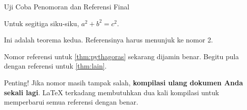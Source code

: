 \documentclass{beamer}
\begin{document}
\begin{frame}{Uji Coba Penomoran dan Referensi Final}

  \begin{Teorema}
    Untuk segitiga siku-siku, $a^2 + b^2 = c^2$.
  \end{Teorema}

  \pause %

  \begin{Teorema}
    Ini adalah teorema kedua. Referensinya harus menunjuk ke nomor 2.
  \end{Teorema}

  \vfill

  Nomor referensi untuk \cref{thm:pythagoras} sekarang dijamin benar.
  Begitu pula dengan referensi untuk \cref{thm:lain}.

  \begin{alertblock}{Penting!}
    Jika nomor masih tampak salah, \textbf{kompilasi ulang dokumen Anda sekali lagi}. LaTeX terkadang membutuhkan dua kali kompilasi untuk memperbarui semua referensi dengan benar.
  \end{alertblock}

\end{frame}
\end{document}
